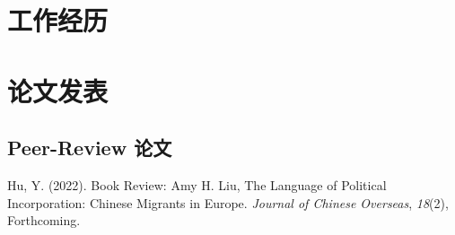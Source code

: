 \documentclass[11pt,a4paper,]{awesome-cv}
\begin{document}
\hypertarget{ux5de5ux4f5cux7ecfux5386}{%
\section{工作经历}\label{ux5de5ux4f5cux7ecfux5386}}

\begin{cventries}
    \vspace{-4.0mm}
    \vspace{-4.0mm}
    \vspace{-4.0mm}
    \vspace{-4.0mm}
    \vspace{-4.0mm}
    \vspace{-4.0mm}
    \vspace{-4.0mm}
    \vspace{-4.0mm}
\end{cventries}

\hypertarget{ux8bbaux6587ux53d1ux8868}{%
\section{论文发表}\label{ux8bbaux6587ux53d1ux8868}}

\hypertarget{peer-review-ux8bbaux6587}{%
\subsection{\texorpdfstring{\textbf{Peer-Review
论文}}{Peer-Review 论文}}\label{peer-review-ux8bbaux6587}}

\begingroup
\setlength{\parindent}{-0.5in}
\setlength{\leftskip}{0.5in}

\hypertarget{bibliography}{}
\leavevmode{}%
Hu, Y. (2022). Book Review: Amy H. Liu, The Language of Political
Incorporation: Chinese Migrants in Europe. \emph{Journal of Chinese
Overseas}, \emph{18}(2), Forthcoming.
\end{document}
